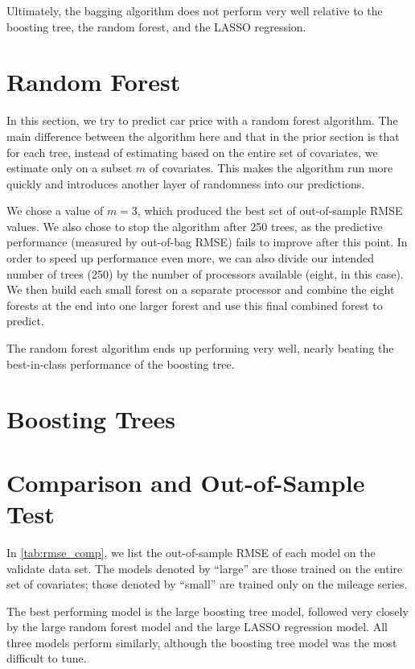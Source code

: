 \documentclass[11pt, fleqn]{article}
\begin{document}
Ultimately, the bagging algorithm does not perform very well relative to the boosting tree, the random forest, and the LASSO regression. 

\section{Random Forest}

In this section, we try to predict car price with a random forest algorithm. The main difference between the algorithm here and that in the prior section is that for each tree, instead of estimating based on the entire set of covariates, we estimate only on a subset $m$ of covariates. This makes the algorithm run more quickly and introduces another layer of randomness into our predictions. 

We chose a value of $m=3$, which produced the best set of out-of-sample RMSE values. We also chose to stop the algorithm after 250 trees, as the predictive performance (measured by out-of-bag RMSE) fails to improve after this point. In order to speed up performance even more, we can also divide our intended number of trees (250) by the number of processors available (eight, in this case). We then build each small forest on a separate processor and combine the eight forests at the end into one larger forest and use this final combined forest to predict.

The random forest algorithm ends up performing very well, nearly beating the best-in-class performance of the boosting tree.

\section{Boosting Trees}

\section{Comparison and Out-of-Sample Test}

In \cref{tab:rmse_comp}, we list the out-of-sample RMSE of each model on the validate data set. The models denoted by ``large'' are those trained on the entire set of covariates; those denoted by ``small'' are trained only on the mileage series.

The best performing model is the large boosting tree model, followed very closely by the large random forest model and the large LASSO regression model. All three models perform similarly, although the boosting tree model was the most difficult to tune.


\end{document}
